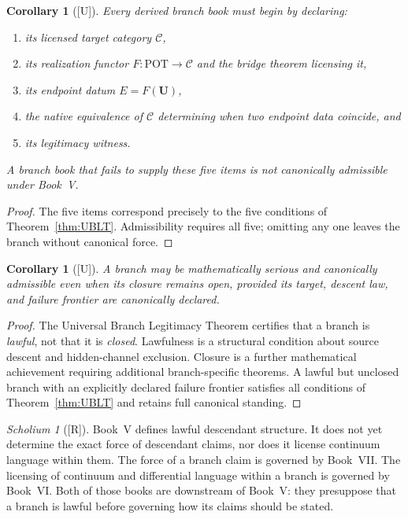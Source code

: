 \documentclass[12pt,oneside]{amsbook}
\theoremstyle{plain}
\newtheorem{corollary}[theorem]{Corollary}
\theoremstyle{definition}
\theoremstyle{remark}
\newtheorem{scholium}[theorem]{Scholium}
\newcommand{\status}[1]{\textup{[#1]}}
\begin{document}
\begin{corollary}[\status{U}]\label{cor:mandatory-declarations}
Every derived branch book must begin by declaring:
\begin{enumerate}[label=\textup{(\arabic*)}]
  \item its licensed target category $\mathcal{C}$,
  \item its realization functor $F: \mathrm{POT} \to \mathcal{C}$
        and the bridge theorem licensing it,
  \item its endpoint datum $E = F(\mathbf{U})$,
  \item the native equivalence of $\mathcal{C}$ determining when two
        endpoint data coincide, and
  \item its legitimacy witness.
\end{enumerate}
A branch book that fails to supply these five items is not
canonically admissible under Book~V.
\end{corollary}

\begin{proof}
The five items correspond precisely to the five conditions of
Theorem~\ref{thm:UBLT}.  Admissibility requires all five; omitting any
one leaves the branch without canonical force.
\end{proof}

\begin{corollary}[\status{U}]\label{cor:open-branch-still-canonical}
A branch may be mathematically serious and canonically admissible even
when its closure remains open, provided its target, descent law, and
failure frontier are canonically declared.
\end{corollary}

\begin{proof}
The Universal Branch Legitimacy Theorem certifies that a branch is
\emph{lawful}, not that it is \emph{closed}.  Lawfulness is a
structural condition about source descent and hidden-channel
exclusion.  Closure is a further mathematical achievement requiring
additional branch-specific theorems.  A lawful but unclosed branch
with an explicitly declared failure frontier satisfies all conditions
of Theorem~\ref{thm:UBLT} and retains full canonical standing.
\end{proof}

\begin{scholium}[\status{R}]\label{sch:UBLT-scope}
Book~V defines lawful descendant structure.  It does not yet determine
the exact force of descendant claims, nor does it license continuum
language within them.  The force of a branch claim is governed by
Book~VII.  The licensing of continuum and differential language within
a branch is governed by Book~VI.  Both of those books are downstream
of Book~V: they presuppose that a branch is lawful before governing
how its claims should be stated.
\end{scholium}
\end{document}
